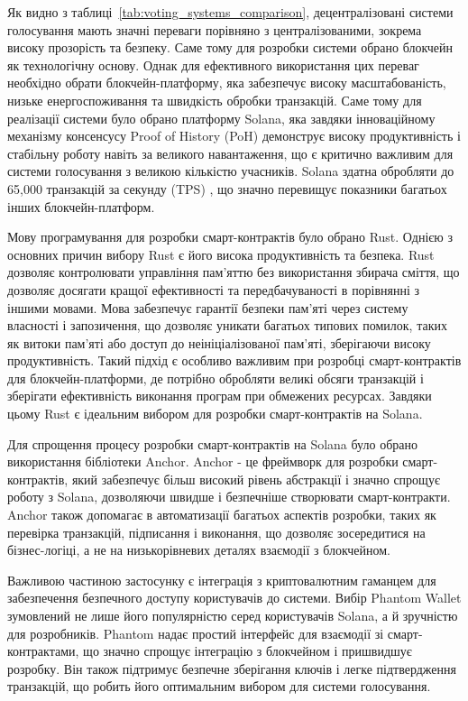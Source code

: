 \documentclass[14pt]{extreport}
\begin{document}
  Як видно з таблиці~\ref{tab:voting_systems_comparison}, децентралізовані системи голосування мають значні переваги порівняно з централізованими, зокрема високу прозорість та безпеку. Саме тому для розробки системи обрано блокчейн як технологічну основу. Однак для ефективного використання цих переваг необхідно обрати блокчейн-платформу, яка забезпечує високу масштабованість, низьке енергоспоживання та швидкість обробки транзакцій. Саме тому для реалізації системи було обрано платформу Solana, яка завдяки інноваційному механізму консенсусу Proof of History (PoH) демонструє високу продуктивність і стабільну роботу навіть за великого навантаження, що є критично важливим для системи голосування з великою кількістю учасників. Solana здатна обробляти до 65,000 транзакцій за секунду (TPS) \cite{solana_report}, що значно перевищує показники багатьох інших блокчейн-платформ.

  Мову програмування для розробки смарт-контрактів було обрано Rust. Однією з основних причин вибору Rust є його висока продуктивність та безпека. Rust дозволяє контролювати управління пам'яттю без використання збирача сміття, що дозволяє досягати кращої ефективності та передбачуваності в порівнянні з іншими мовами. Мова забезпечує гарантії безпеки пам'яті через систему власності і запозичення, що дозволяє уникати багатьох типових помилок, таких як витоки пам'яті або доступ до неініціалізованої пам'яті, зберігаючи високу продуктивність. Такий підхід є особливо важливим при розробці смарт-контрактів для блокчейн-платформи, де потрібно обробляти великі обсяги транзакцій і зберігати ефективність виконання програм при обмежених ресурсах. Завдяки цьому Rust є ідеальним вибором для розробки смарт-контрактів на Solana.

  Для спрощення процесу розробки смарт-контрактів на Solana було обрано використання бібліотеки Anchor. Anchor - це фреймворк для розробки смарт-контрактів, який забезпечує більш високий рівень абстракції і значно спрощує роботу з Solana, дозволяючи швидше і безпечніше створювати смарт-контракти. Anchor також допомагає в автоматизації багатьох аспектів розробки, таких як перевірка транзакцій, підписання і виконання, що дозволяє зосередитися на бізнес-логіці, а не на низькорівневих деталях взаємодії з блокчейном.

  Важливою частиною застосунку є інтеграція з криптовалютним гаманцем для забезпечення безпечного доступу користувачів до системи. Вибір Phantom Wallet зумовлений не лише його популярністю серед користувачів Solana, а й зручністю для розробників. Phantom надає простий інтерфейс для взаємодії зі смарт-контрактами, що значно спрощує інтеграцію з блокчейном і пришвидшує розробку. Він також підтримує безпечне зберігання ключів і легке підтвердження транзакцій, що робить його оптимальним вибором для системи голосування.
\end{document}

